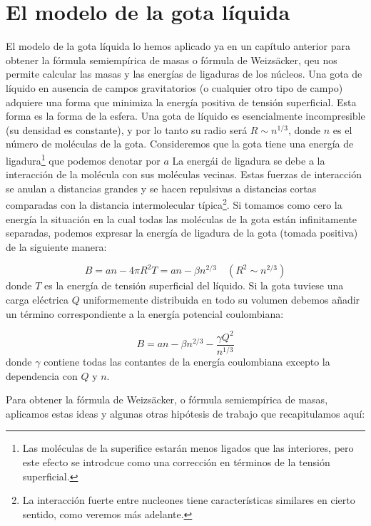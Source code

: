 \section{El modelo de la gota líquida}

El modelo de la gota líquida lo hemos aplicado ya en un capítulo anterior para obtener la fórmula semiempírica de masas o fórmula de Weizsäcker, qeu nos permite calcular las masas y las energías de ligaduras de los núcleos. Una gota de líquido en ausencia de campos gravitatorios (o cualquier otro tipo de campo) adquiere una forma que minimiza la energía positiva de tensión superficial. Esta forma es la forma de la esfera. Una gota de líquido es esencialmente incompresible (su densidad es constante), y por lo tanto su radio será $R\sim n^{1/3}$, donde $n$ es el número de moléculas de la gota. Consideremos que la gota tiene una energía de ligadura\footnote{Las moléculas de la superifice estarán menos ligados que las interiores, pero este efecto se introdcue como una corrección en términos de la tensión superficial.}  que podemos denotar por $a$ La energái de ligadura se debe a la interacción de la molécula con sus moléculas vecinas. Estas fuerzas de interacción se anulan a distancias grandes y se hacen repulsivas a distancias cortas comparadas con la distancia intermolecular típica\footnote{La interacción fuerte entre nucleones tiene características similares en cierto sentido, como veremos más adelante.}. Si tomamos como cero la energía la situación en la cual todas las moléculas de la gota están infinitamente separadas, podemos expresar la energía de ligadura de la gota (tomada positiva) de la siguiente manera:

\begin{equation}
    B=an - 4 \pi R^2 T = an-\beta n^{2/3} \quad (R^2 \sim n^{2/3})
\end{equation}
donde $T$ es la energía de tensión superficial del líquido. Si la gota tuviese una carga eléctrica $Q$ uniformemente distribuida en todo su volumen debemos añadir un término correspondiente a la energía potencial coulombiana:

\begin{equation}
    B = an - \beta n^{2/3} - \frac{\gamma Q^2}{n^{1/3}}
\end{equation}
donde $\gamma$ contiene todas las contantes de la energía coulombiana excepto la dependencia con $Q$ y $n$. 

Para obtener la fórmula de Weizsäcker, o fórmula semiempírica de masas, aplicamos estas ideas y algunas otras hipótesis de trabajo que recapitulamos aquí:

